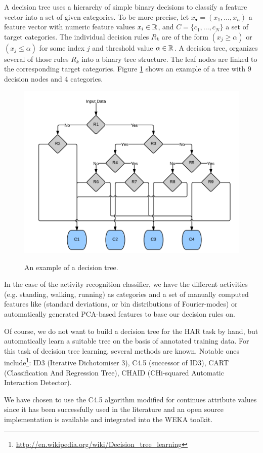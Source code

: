 A decision tree uses a hierarchy of simple binary decisions to
classify a feature vector into a set of given categories.  To be more
precise, let $x_\bullet = (x_1, \dots, x_n)$ a feature vector with numeric
feature values $x_i \in \mathbb{R}$, and $C=\{c_1, \dots, c_N\}$ a set of
target categories. The individual decision rules $R_k$ are of the form
$(x_j \geq \alpha)$ or $(x_j \leq \alpha)$ for some index $j$ and
threshold value $\alpha \in \mathbb{R}$.  A decision tree, organizes several
of those rules $R_k$ into a binary tree structure. The leaf nodes are
linked to the corresponding target categories. Figure
\ref{fig:decision_tree} shows an example of a tree with 9 decision
nodes and 4 categories.

\begin{figure}[h]
\centering
\includegraphics[width=0.5 \textwidth]{img/har/decision_tree.png}
\label{fig:decision_tree}
\caption{An example of a decision tree.}
\end{figure}

In the case of the activity recognition classifier, we have the
different activities (e.g. standing, walking, running) as 
categories and a set of manually computed features like (standard
deviations, or bin distributions of Fourier-modes) or automatically
generated PCA-based features to base our decision rules on.

Of course, we do not want to build a decision tree for the HAR task by
hand, but automatically learn a suitable tree on the basis of
annotated training data. For this task of decision tree learning,
several methods are known. Notable ones
include\footnote{\url{http://en.wikipedia.org/wiki/Decision_tree_learning}}:
ID3 (Iterative Dichotomiser 3), C4.5 (successor of ID3), CART
(Classification And Regression Tree), CHAID (CHi-squared Automatic
Interaction Detector).

We have chosen to use the C4.5 algorithm modified for continues
attribute values \cite{quinlan1996improved} since it has been
successfully used in the literature \cite{lara12} and an open source
implementation is available and integrated into the WEKA toolkit.

